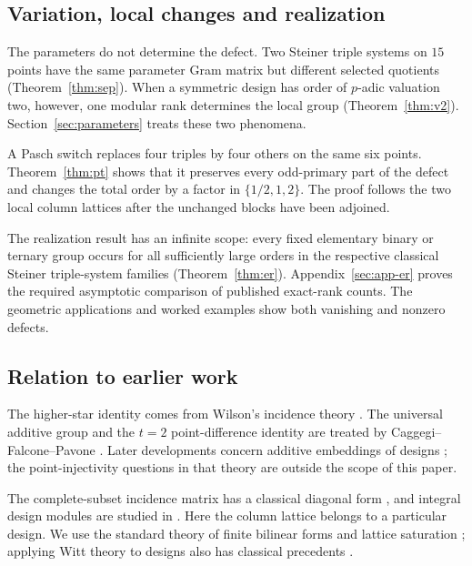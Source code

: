 \subsection{Variation, local changes and realization}

The parameters do not determine the defect. Two Steiner triple systems on
$15$ points have the same parameter Gram matrix but different selected
quotients (Theorem~\ref{thm:sep}). When a symmetric design has order of
$p$-adic valuation two, however, one modular rank determines the local group
(Theorem~\ref{thm:v2}). Section~\ref{sec:parameters} treats these two phenomena.

A Pasch switch replaces four triples by four others on the same six points.
Theorem~\ref{thm:pt} shows that it preserves every odd-primary part of the
defect and changes the total order by a factor in $\{1/2,1,2\}$.
The proof follows the two local column lattices after the unchanged blocks
have been adjoined.

The realization result has an infinite scope: every fixed elementary binary
or ternary group occurs for all sufficiently large orders in the respective
classical Steiner triple-system families (Theorem~\ref{thm:er}). Appendix~\ref{sec:app-er}
proves the required asymptotic comparison of published exact-rank counts.
The geometric applications and worked examples show both vanishing and
nonzero defects.

\subsection{Relation to earlier work}

The higher-star identity comes from Wilson's incidence theory
\cite{Wilson1982,KiermaierWassermann}. The universal additive group and the
$t=2$ point-difference identity are treated by Caggegi--Falcone--Pavone
\cite{CFP2017}. Later developments concern additive embeddings of designs
\cite{BurattiNakic,BMN2025}; the point-injectivity questions in that theory
are outside the scope of this paper.

The complete-subset incidence matrix has a classical diagonal form
\cite{Wilson}, and integral design modules are studied in
\cite{GraverJurkat,GrahamLiLi,Keevash}. Here the column lattice belongs to a
particular design. We use the standard theory of finite bilinear forms and
lattice saturation \cite{Wall1963,Nikulin}; applying Witt theory to designs
also has classical precedents \cite[Sections 5--6]{WilsonNotes}.

